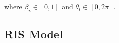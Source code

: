 \noindent where $\beta_i \in [0,1]$ and $\theta_i \in [0, 2\pi]$.











\subsection{RIS Model}

